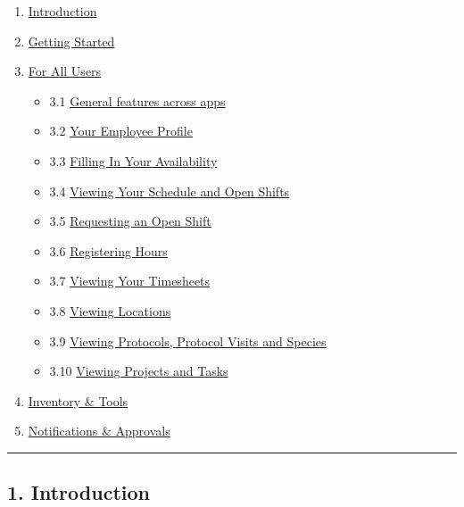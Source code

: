 \documentclass[
  paper=a4,
  ,captions=tableheading
]{scrartcl}
\providecommand{\tightlist}{%
  \setlength{\itemsep}{0pt}\setlength{\parskip}{0pt}}
\begin{document}
\begin{enumerate}
\def\labelenumi{\arabic{enumi}.}
\tightlist
\item
  \protect\hyperlink{introduction}{Introduction}
\item
  \protect\hyperlink{getting-started}{Getting Started}
\item
  \protect\hyperlink{for-all-users}{For All Users}

  \begin{itemize}
  \tightlist
  \item
    3.1 \protect\hyperlink{general-features-across-apps}{General
    features across apps}
  \item
    3.2 \protect\hyperlink{your-employee-profile}{Your Employee Profile}
  \item
    3.3 \protect\hyperlink{filling-in-your-availability}{Filling In Your
    Availability}
  \item
    3.4
    \protect\hyperlink{viewing-your-schedule-and-open-shifts}{Viewing
    Your Schedule and Open Shifts}
  \item
    3.5 \protect\hyperlink{requesting-an-open-shift}{Requesting an Open
    Shift}
  \item
    3.6 \protect\hyperlink{registering-hours}{Registering Hours}
  \item
    3.7 \protect\hyperlink{viewing-your-timesheets}{Viewing Your
    Timesheets}
  \item
    3.8 \protect\hyperlink{viewing-locations}{Viewing Locations}
  \item
    3.9
    \protect\hyperlink{viewing-protocols-protocol-visits-and-species}{Viewing
    Protocols, Protocol Visits and Species}
  \item
    3.10 \protect\hyperlink{viewing-project-and-tasks}{Viewing Projects
    and Tasks}
  \end{itemize}
\item
  \protect\hyperlink{inventory-tools}{Inventory \& Tools}
\item
  \protect\hyperlink{notifications-approvals}{Notifications \&
  Approvals}
\end{enumerate}

\begin{center}\rule{0.5\linewidth}{0.5pt}\end{center}

\hypertarget{introduction}{%
\subsection{1. Introduction}\label{introduction}}
\end{document}
